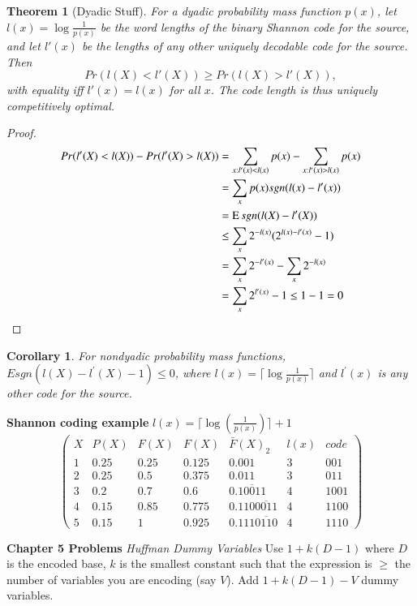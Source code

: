 \documentclass[10pt]{article}
\DeclareMathOperator*{\E}{\mbox{\text{E}}}
\newtheorem{thm}{Theorem}[section]
\newtheorem{corollary}{Corollary}[section]
\begin{document}
\begin{tiny}
\begin{multicols}{3}
\begin{thm}[Dyadic Stuff] \label{thm: dyadic}
For a dyadic probability mass function $p(x)$, let $l(x) = \log \frac{1}{p(x)}$ be the word lengths of the binary Shannon code for the source, and let $l'(x)$ be the lengths of any other uniquely decodable code for the source. Then 
\[Pr(l(X) < l'(X)) \geq Pr(l(X) > l'(X)),\] 
with equality iff $l'(x) = l(x)$ for all $x$. The code length is thus uniquely competitively optimal.
\end{thm}
\begin{proof}
\begin{align*}
Pr(l'(X) < l(X)) - Pr(l'(X) > l(X)) &= \sum_{x:l'(x)<l(x)} p(x) - \sum_{x:l'(x)>l(x)} p(x)\\
&=\sum_x p(x)sgn(l(x) - l'(x)) \\
&= \E sgn(l(X) - l'(X)) \\
&\leq \sum_x 2^{-l(x)} (2^{l(x)-l'(x)} - 1)\\
&=\sum_x 2^{-l'(x)} - \sum_x 2^{-l(x)} \\
&=\sum_x 2^{l'(x)} - 1 \leq 1-1 = 0 
\end{align*}
\end{proof}
\begin{corollary}For nondyadic probability mass functions,
$E sgn(l(X) - l^{'}(X) - 1) \leq 0$, where $l(x) = \lceil \log \frac {1}{p(x)} \rceil$ and $l^{'}(x)$ is any other code for the source.
\end{corollary}

\textbf{\scriptsize Shannon coding example}
$l(x)= \lceil \log(\frac{1}{p(x)}) \rceil + 1$
\[
\begin{pmatrix}
      X & P(X) & F(X)  & F(X) & \bar{F}(X)_{2} & l(x) & code  \\
      1 & 0.25 & 0.25 & 0.125 & 0.001 & 3 & 001\\ 
      2 & 0.25 & 0.5 & 0.375 & 0.011 & 3 & 011\\ 
      3 & 0.2 & 0.7 & 0.6 & 0.\overline{10011} & 4 & 1001\\ 
      4 & 0.15 & 0.85 & 0.775 & 0.110 \overline{0011} & 4 & 1100\\ 
      5 & 0.15 & 1 & 0.925 & 0.111\overline{0110} & 4 & 1110
\end{pmatrix}
\]


\textbf{\scriptsize Chapter 5 Problems}
\textit{Huffman Dummy Variables}
Use $1+k(D-1)$ where $D$ is the encoded base, $k$ is the smallest constant such that the expression is $\geq$ the number of variables you are encoding (say $V$). Add $1+k(D-1) - V$ dummy variables.


\end{multicols}
\end{tiny}
\end{document}
